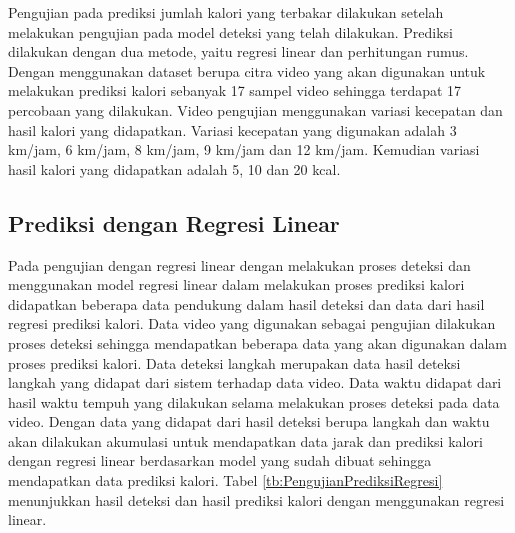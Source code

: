 Pengujian pada prediksi jumlah kalori yang terbakar dilakukan setelah melakukan pengujian pada model deteksi yang telah dilakukan. Prediksi dilakukan dengan dua metode, yaitu regresi linear dan perhitungan rumus. Dengan menggunakan dataset berupa citra video yang akan digunakan untuk melakukan prediksi kalori sebanyak 17 sampel video sehingga terdapat 17 percobaan yang dilakukan. Video pengujian menggunakan variasi kecepatan dan hasil kalori yang didapatkan. Variasi kecepatan yang digunakan adalah 3 km/jam, 6 km/jam, 8 km/jam, 9 km/jam dan 12 km/jam. Kemudian variasi hasil kalori yang didapatkan adalah 5, 10 dan 20 kcal. 

\subsection{Prediksi dengan Regresi Linear}
\label{subsec:PengujianPrediksiRegresi}

Pada pengujian dengan regresi linear dengan melakukan proses deteksi dan menggunakan model regresi linear dalam melakukan proses prediksi kalori didapatkan beberapa data pendukung dalam hasil deteksi dan data dari hasil regresi prediksi kalori. Data video yang digunakan sebagai pengujian dilakukan proses deteksi sehingga mendapatkan beberapa data yang akan digunakan dalam proses prediksi kalori. Data deteksi langkah merupakan data hasil deteksi langkah yang didapat dari sistem terhadap data video. Data waktu didapat dari hasil waktu tempuh yang dilakukan selama melakukan proses deteksi pada data video. Dengan data yang didapat dari hasil deteksi berupa langkah dan waktu akan dilakukan akumulasi untuk mendapatkan data jarak dan prediksi kalori dengan regresi linear berdasarkan model yang sudah dibuat sehingga mendapatkan data prediksi kalori. Tabel \ref{tb:PengujianPrediksiRegresi} menunjukkan hasil deteksi dan hasil prediksi kalori dengan menggunakan regresi linear.

